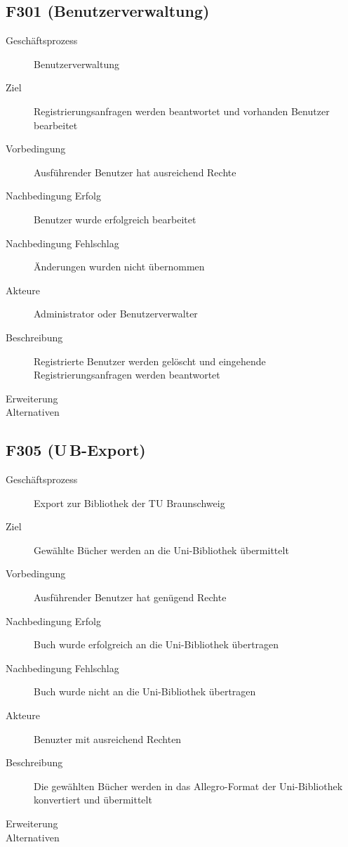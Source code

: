 \subsection{F301 (Benutzerverwaltung)}
\begin{description}
  \item[Geschäftsprozess]Benutzerverwaltung
  \item[Ziel]Registrierungsanfragen werden beantwortet und vorhanden Benutzer bearbeitet
  \item[Vorbedingung]Ausführender Benutzer hat ausreichend Rechte
  \item[Nachbedingung Erfolg]Benutzer wurde erfolgreich bearbeitet
  \item[Nachbedingung Fehlschlag]Änderungen wurden nicht übernommen
  \item[Akteure]Administrator oder Benutzerverwalter
  \item[Beschreibung]Registrierte Benutzer werden gelöscht und eingehende Registrierungsanfragen werden beantwortet
  \item[Erweiterung]
  \item[Alternativen]
\end{description}

\subsection{F305 (U\,B-Export)}	%
\begin{description}
  \item[Geschäftsprozess]Export zur Bibliothek der TU Braunschweig
  \item[Ziel]Gewählte Bücher werden an die Uni-Bibliothek übermittelt
  \item[Vorbedingung]Ausführender Benutzer hat genügend Rechte
  \item[Nachbedingung Erfolg]Buch wurde erfolgreich an die Uni-Bibliothek übertragen
  \item[Nachbedingung Fehlschlag]Buch wurde nicht an die Uni-Bibliothek übertragen
  \item[Akteure]Benuzter mit ausreichend Rechten
  \item[Beschreibung]Die gewählten Bücher werden in das Allegro-Format der Uni-Bibliothek konvertiert und übermittelt
  \item[Erweiterung]
  \item[Alternativen]
\end{description}

